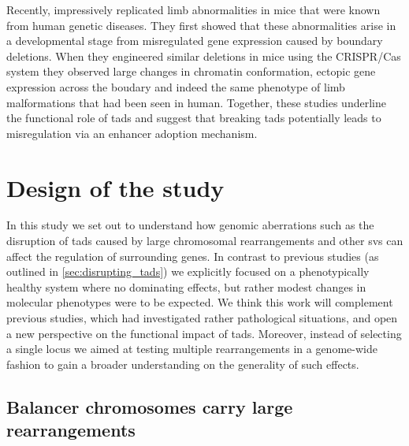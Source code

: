 Recently, \cite{Lupianez2015} impressively replicated limb abnormalities in mice
that were known from human genetic diseases. They first showed that these
abnormalities arise in a developmental stage from misregulated gene expression
caused by \tad boundary deletions. When they engineered similar deletions in
mice using the CRISPR/Cas system they observed large changes in chromatin
conformation, ectopic gene expression across the boudary and indeed the same
phenotype of limb malformations that had been seen in human. Together, these
studies underline the functional role of \acp{tad} and suggest that breaking
\acp{tad} potentially leads to misregulation via an enhancer adoption mechanism.







\section{Design of the study}
\label{sec:balancer_study_design}

In this study we set out to understand how genomic aberrations such as the
disruption of \acp{tad} caused by large chromosomal rearrangements and other
\acp{sv} can affect the regulation of surrounding genes. In contrast to previous
studies (as outlined in \cref{sec:disrupting_tads}) we explicitly
focused on a phenotypically healthy system where no dominating effects, but
rather modest changes in molecular phenotypes were to be expected. We think this
work will complement previous studies, which had investigated rather
pathological situations, and open a new perspective on the functional impact of
\acp{tad}. Moreover, instead of selecting a single locus we aimed at testing
multiple rearrangements in a genome-wide fashion to gain a broader understanding
on the generality of such effects.




\subsection{Balancer chromosomes carry large rearrangements}
\label{sec:balancer_balancers}

